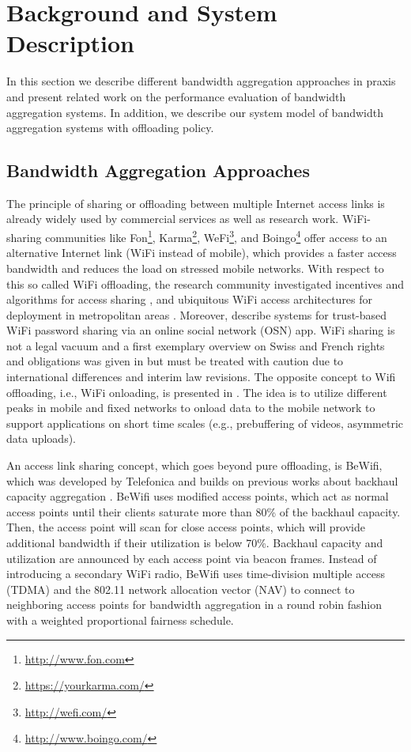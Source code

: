 \section{Background and System Description}\label{sec:aggregation:background}
In this section we describe different bandwidth aggregation approaches in praxis and present related work on the performance evaluation of bandwidth aggregation systems.
In addition, we describe our system model of bandwidth aggregation systems with offloading policy.

\subsection{Bandwidth Aggregation Approaches}\label{sec:aggregation:background:aggr}

The principle of sharing or offloading between multiple Internet access links is already widely used by commercial services as well as research work. WiFi-sharing communities like Fon\footnote{\url{http://www.fon.com}}, Karma\footnote{\url{https://yourkarma.com/}}, WeFi\footnote{\url{http://wefi.com/}}, and Boingo\footnote{\url{http://www.boingo.com/}} offer access to an alternative Internet link (WiFi instead of mobile), which provides a faster access bandwidth and reduces the load on stressed mobile networks. With respect to this so called WiFi offloading, the research community investigated incentives and algorithms for access sharing \cite{mamatas2010incentives}, and ubiquitous WiFi access architectures for deployment in metropolitan areas \cite{sastry2007architecting, vidales2009metropolitan}. Moreover, \cite{lafuente2011flexible,donelson2012patent,seufert2013horst} describe systems for trust-based WiFi password sharing via an online social network (OSN) app. WiFi sharing is not a legal vacuum and a first exemplary overview on Swiss and French rights and obligations was given in \cite{camponovo2005wlan} but must be treated with caution due to international differences and interim law revisions.
The opposite concept to Wifi offloading, i.e., WiFi onloading, is presented in \cite{rossi20133gol}. The idea is to utilize different peaks in mobile and fixed networks to onload data to the mobile network to support applications on short time scales (e.g., prebuffering of videos, asymmetric data uploads).

An access link sharing concept, which goes beyond pure offloading, is BeWifi, which was developed by Telefonica \cite{goma2013patent} and builds on previous works about backhaul capacity aggregation \cite{kandula2008fatvap,giustiniano2010fair}. BeWifi uses modified access points, which act as normal access points until their clients saturate more than 80\% of the backhaul capacity. Then, the access point will scan for close access points, which will provide additional bandwidth if their utilization is below 70\%. Backhaul capacity and utilization are announced by each access point via beacon frames. Instead of introducing a secondary WiFi radio, BeWifi uses time-division multiple access (TDMA) and the 802.11 network allocation vector (NAV) to connect to neighboring access points for bandwidth aggregation in a round robin fashion with a weighted proportional fairness schedule.

